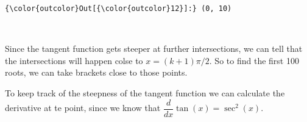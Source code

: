 \documentclass{article}
\begin{document}
            \begin{Verbatim}[commandchars=\\\{\}]
{\color{outcolor}Out[{\color{outcolor}12}]:} (0, 10)
\end{Verbatim}
        
    \begin{center}
    \end{center}
    { \hspace*{\fill} \\}
    
    Since the tangent function gets steeper at further intersections, we can
tell that the intersections will happen colse to $x = (k+1)\pi /2$. So
to find the first 100 roots, we can take brackets close to those points.

To keep track of the steepness of the tangent function we can calculate
the derivative at te point, since we know that
$\dfrac{d}{dx}\tan(x) = \sec^{2}(x)$.
\end{document}
